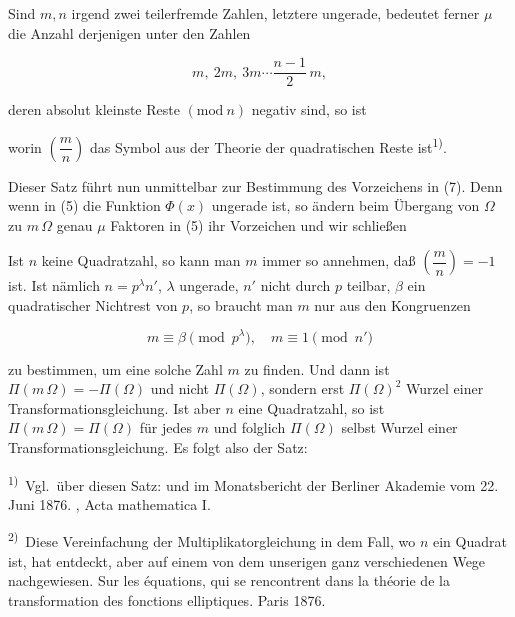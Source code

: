 Sind $m, n$ irgend zwei teilerfremde Zahlen, letztere ungerade, bedeutet ferner $\mu$ die Anzahl derjenigen unter den Zahlen

\[
m,\ 2m,\ 3m \cdots \frac{n-1}{2}\,m,
\]

deren absolut kleinste Reste $(\mathrm{mod}\ n)$ negativ sind, so ist


worin $\left(\dfrac{m}{n}\right)$ das  Symbol aus der Theorie der quadratischen Reste ist\textsuperscript{1)}.

Dieser Satz führt nun unmittelbar zur Bestimmung des Vorzeichens in (7). Denn wenn in (5) die Funktion $\Phi(x)$ ungerade ist, so ändern beim Übergang von $\Omega$ zu $m\,\Omega$ genau $\mu$ Faktoren in (5) ihr Vorzeichen und wir schließen


Ist $n$ keine Quadratzahl, so kann man $m$ immer so annehmen, daß $\left(\dfrac{m}{n}\right) = -1$ ist. Ist nämlich $n = p^\lambda n'$, $\lambda$ ungerade, $n'$ nicht durch $p$ teilbar, $\beta$ ein quadratischer Nichtrest von $p$, so braucht man $m$ nur aus den Kongruenzen

\[
m \equiv \beta \pmod{p^\lambda}, \quad m \equiv 1 \pmod{n'}
\]

zu bestimmen, um eine solche Zahl $m$ zu finden. Und dann ist $\Pi(m\,\Omega) = -\Pi(\Omega)$ und nicht $\Pi(\Omega)$, sondern erst $\Pi(\Omega)^2$ Wurzel einer Transformationsgleichung. Ist aber $n$ eine Quadratzahl, so ist $\Pi(m\,\Omega) = \Pi(\Omega)$ für jedes $m$ und folglich $\Pi(\Omega)$ selbst Wurzel einer Transformationsgleichung. Es folgt also der Satz:

\begin{quote}
\end{quote}

\textsuperscript{1)}~Vgl.\ über diesen Satz:  und  im Monatsbericht der Berliner Akademie vom 22.\,Juni 1876. , Acta mathematica I.

\textsuperscript{2)}~Diese Vereinfachung der Multiplikatorgleichung in dem Fall, wo $n$ ein Quadrat ist, hat  entdeckt, aber auf einem von dem unserigen ganz verschiedenen Wege nachgewiesen. \glqq Sur les équations, qui se rencontrent dans la théorie de la transformation des fonctions elliptiques.\grqq{} Paris 1876.
